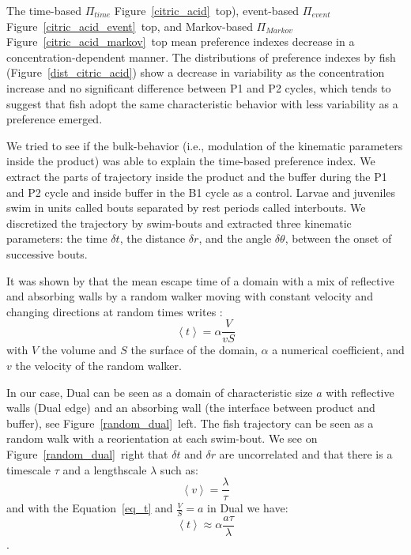   The time-based $\Pi_{time}$ Figure~\ref{citric_acid}~top), event-based $\Pi_{event}$ Figure~\ref{citric_acid_event}~top, and Markov-based $\Pi_{Markov}$ Figure~\ref{citric_acid_markov}~top mean preference indexes decrease in a concentration-dependent manner. The distributions of preference indexes by fish (Figure~\ref{dist_citric_acid}) show a decrease in variability as the concentration increase and no significant difference between P1 and P2 cycles, which tends to suggest that fish adopt the same characteristic behavior with less variability as a preference emerged.

  We tried to see if the bulk-behavior (i.e., modulation of the kinematic parameters inside the product) was able to explain the time-based preference index. We extract the parts of trajectory inside the product and the buffer during the P1 and P2 cycle and inside buffer in the B1 cycle as a control. Larvae and juveniles swim in units called bouts separated by rest periods called interbouts. We discretized the trajectory by swim-bouts and extracted three kinematic parameters: the time $\delta t$, the distance $\delta r$, and the angle $\delta \theta$, between the onset of successive bouts.

  It was shown by \cite{benichou2005averaged} that the mean escape time of a domain with a mix of reflective and absorbing walls by a random walker moving with constant velocity and changing directions at random times writes :
  \begin{equation}
    \label{eq_t}
    \left< t \right> = \alpha \frac{V}{vS}
  \end{equation}
  \noindent with $V$ the volume and $S$ the surface of the domain, $\alpha$ a numerical coefficient, and $v$ the velocity of the random walker.

  In our case, Dual can be seen as a domain of characteristic size $a$ with reflective walls (Dual edge) and an absorbing wall (the interface between product and buffer), see Figure~\ref{random_dual}~left. The fish trajectory can be seen as a random walk with a reorientation at each swim-bout. We see on Figure~\ref{random_dual}~right that $\delta t$ and $\delta r$ are uncorrelated and that there is a timescale $\tau$ and a lengthscale $\lambda$ such as:
  \begin{equation}
    \left< v \right> = \frac{\lambda}{\tau}
  \end{equation}
  \noindent and with the Equation~\ref{eq_t} and $\frac{V}{S}=a$ in Dual we have:
  \begin{equation}
    \left< t \right> \approx \alpha \frac{a \tau}{\lambda}
  \end{equation}.

